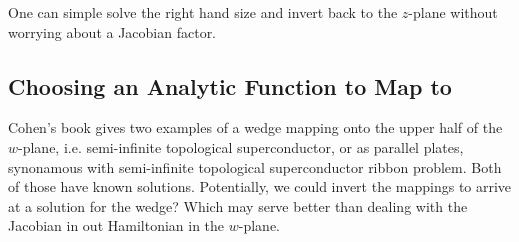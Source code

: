 One can simple solve the right hand size and invert back to the $z$-plane without worrying about a Jacobian factor.

\subsection{Choosing an Analytic Function to Map to}

Cohen's book gives two examples of a wedge mapping onto the upper half of the $w$-plane, i.e. semi-infinite topological superconductor, or as parallel plates, synonamous with semi-infinite topological superconductor ribbon problem. 
Both of those have known solutions. 
Potentially, we could invert the mappings to arrive at a solution for the wedge? 
Which may serve better than dealing with the Jacobian in out Hamiltonian in the $w$-plane.

